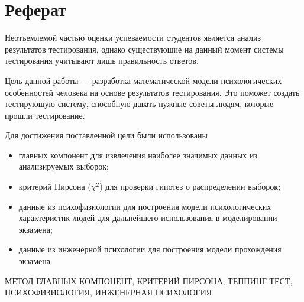 \chapter*{Реферат}

Неотъемлемой частью оценки успеваемости студентов является анализ результатов
тестирования, однако существующие на данный момент системы тестирования
учитывают лишь правильность ответов.

Цель данной работы --- разработка математической модели психологических
особенностей человека на основе результатов тестирования.
Это поможет создать тестирующую систему, способную давать нужные советы
людям, которые прошли тестирование.

Для достижения поставленной цели были использованы
\begin{itemize}
  \item 
    главных компонент для извлечения наиболее значимых  данных из анализируемых
    выборок;
  \item
    критерий Пирсона ($\chi^2$) для проверки гипотез о распределении выборок;
  \item
    данные из психофизиологии для построения модели психологических
    характеристик людей для дальнейшего использования в моделировании экзамена;
  \item
    данные из инженерной психологии для построения модели прохождения экзамена.
\end{itemize}

\MakeUppercase{Метод главных компонент, критерий Пирсона, теппинг-тест,
психофизиология, инженерная психология}
